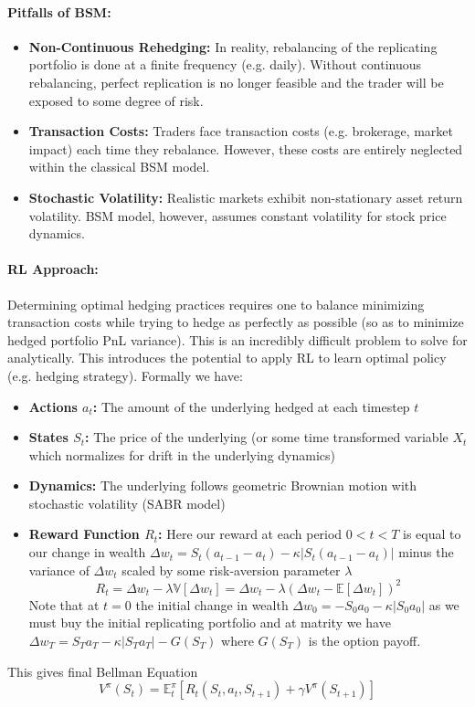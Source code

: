 \documentclass{article}
\begin{document}
\paragraph{Pitfalls of BSM:}
\begin{itemize}
    \item \textbf{Non-Continuous Rehedging:} In reality, rebalancing of the replicating portfolio is done at a finite frequency (e.g. daily). Without continuous rebalancing, perfect replication is no longer feasible and the trader will be exposed to some degree of risk.
    \item \textbf{Transaction Costs:} Traders face transaction costs (e.g. brokerage, market impact) each time they rebalance. However, these costs are entirely neglected within the classical BSM model.
    \item \textbf{Stochastic Volatility:} Realistic markets exhibit non-stationary asset return volatility. BSM model, however, assumes constant volatility for stock price dynamics.
\end{itemize}

\paragraph{RL Approach:} Determining optimal hedging practices requires one to balance minimizing transaction costs while trying to hedge as perfectly as possible (so as to minimize hedged portfolio PnL variance). This is an incredibly difficult problem to solve for analytically. This introduces the potential to apply RL to learn optimal policy (e.g. hedging strategy). Formally we have:
\begin{itemize}
    \item \textbf{Actions $a_t$:} The amount of the underlying hedged at each timestep $t$
    \item \textbf{States $S_t$:} The price of the underlying (or some time transformed variable $X_t$ which normalizes for drift in the underlying dynamics)
    \item \textbf{Dynamics:} The underlying follows geometric Brownian motion with stochastic volatility (SABR model)
    \item \textbf{Reward Function $R_t$:}
    Here our reward at each period $0<t<T$ is equal to our change in wealth $\Delta w_t = S_t(a_{t-1}-a_t)-\kappa|S_t(a_{t-1}-a_t)|$ minus the variance of $\Delta w_t$ scaled by some risk-aversion parameter $\lambda$
    \[R_t = \Delta w_t - \lambda\mathbb{V}[\Delta w_t] = \Delta w_t - \lambda(\Delta w_t-\mathbb{E}[\Delta w_t])^2\]
    Note that at $t=0$ the initial change in wealth $\Delta w_0=-S_0a_0-\kappa |S_0a_0|$ as we must buy the initial replicating portfolio and at matrity we have  $\Delta w_T=S_Ta_T-\kappa |S_Ta_T|-G(S_T)$ where $G(S_T)$ is the option payoff.
\end{itemize}
This gives final Bellman Equation \[V^{\pi}(S_t) = \mathbb{E}^{\pi}_t[R_t(S_t,a_t,S_{t+1})+\gamma V^{\pi}(S_{t+1})]\]
\end{document}

